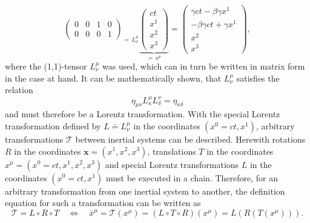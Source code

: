 \documentclass[a4paper,11pt]{article}
\numberwithin{equation}{section}
\newcommand\vect[1]{\ensuremath{\bm{#1}}}
\begin{document}
{\begin{equation}
{\begin{pmatrix}
0 & 0 & 1 & 0 \\
0 & 0 & 0 & 1
\end{pmatrix}}_{= \, L^\mu_{\nu}}\underbrace{\begin{pmatrix}
ct \\ x^1 \\ x^2 \\ x^3
\end{pmatrix}}_{= \, x^\nu} = \begin{pmatrix}
\gamma ct - \beta\gamma x^1 \\ -\beta\gamma ct + \gamma x^1 \\ x^2 \\ x^3
\end{pmatrix},
\end{equation} where the (1,1)-tensor $L^\mu_{\nu}$ was used, which can in turn be written in matrix form in the case at hand. It can be mathematically shown, that $L^\mu_{\nu}$ satisfies the relation \begin{equation}
\eta_{\mu\nu} L^\mu_{\kappa}L^\nu_{\delta} = \eta_{\kappa \delta}
\end{equation} and must therefore be a Lorentz transformation. With the special Lorentz transformation defined by $L \doteq L^\mu_{\nu}$ in the coordinates $(x^0=ct, x^1)$, arbitrary transformations $\mathcal{T}$ between inertial systems can be described. Herewith rotations $R$ in the coordinates $\vect{x} = (x^1,x^2,x^3)$, translations $T$ in the coordinates $x^\mu = (x^0=ct,x^1,x^2,x^3)$ and special Lorentz transformations $L$ in the coordinates $(x^0 = ct, x^1)$ must be executed in a chain. Therefore, for an arbitrary transformation from one inertial system to another, the definition equation for such a transformation can be written as \begin{equation}
\mathcal{T} = L \circ R \circ T \quad \Leftrightarrow \quad \bar{x}^\mu = \mathcal{T}(x^\mu) = (L\circ T \circ R)(x^\mu) = L(R(T(x^\mu))).
\end{equation}
}
\end{document}
